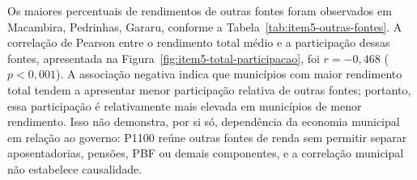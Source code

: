 Os maiores percentuais de rendimentos de outras fontes foram observados em Macambira, Pedrinhas, Gararu, conforme a Tabela~\ref{tab:item5-outras-fontes}. A correlação de Pearson entre o rendimento total médio e a participação dessas fontes, apresentada na Figura~\ref{fig:item5-total-participacao}, foi $r = -0{,}468$ ($p < 0{,}001$). A associação negativa indica que municípios com maior rendimento total tendem a apresentar menor participação relativa de outras fontes; portanto, essa participação é relativamente mais elevada em municípios de menor rendimento. Isso não demonstra, por si só, dependência da economia municipal em relação ao governo: P1100 reúne outras fontes de renda sem permitir separar aposentadorias, pensões, PBF ou demais componentes, e a correlação municipal não estabelece causalidade.
